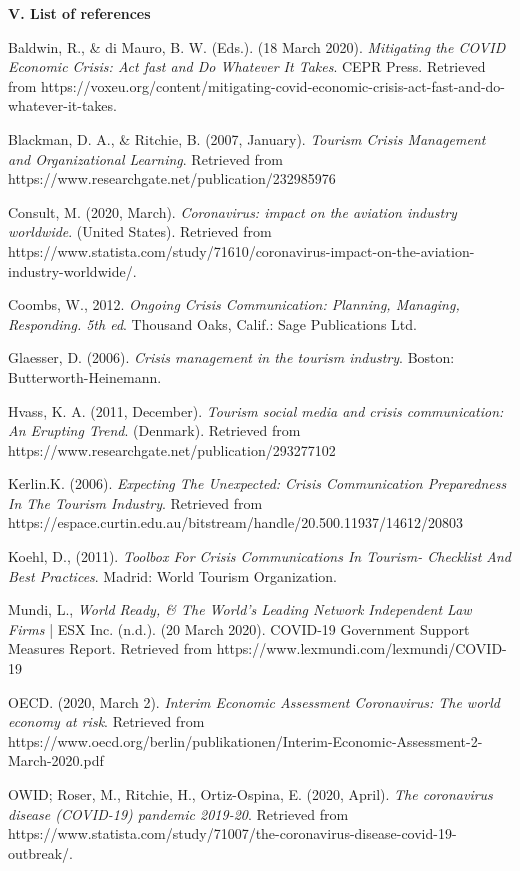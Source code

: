 \thispagestyle{plain}
\textbf{V. List of references}
\begin{flushleft}
		Baldwin, R., \& di Mauro, B. W. (Eds.). (18 March 2020). \textit{Mitigating the COVID Economic Crisis: Act fast and Do Whatever It Takes}. CEPR Press. Retrieved from https://voxeu.org/content/mitigating-covid-economic-crisis-act-fast-and-do-whatever-it-takes.

		Blackman, D. A., \& Ritchie, B. (2007, January). \textit{Tourism Crisis Management and Organizational Learning}. Retrieved from https://www.researchgate.net/publication/232985976

		Consult, M. (2020, March). \textit{Coronavirus: impact on the aviation industry worldwide}. (United States). Retrieved from https://www.statista.com/study/71610/coronavirus-impact-on-the-aviation-industry-worldwide/.

		Coombs, W., 2012. \textit{Ongoing Crisis Communication: Planning, Managing, Responding. 5th ed}. Thousand Oaks, Calif.: Sage Publications Ltd.

		Glaesser, D. (2006). \textit{Crisis management in the tourism industry}. Boston: Butterworth-Heinemann.

		Hvass, K. A. (2011, December). \textit{Tourism social media and crisis communication: An Erupting Trend}. (Denmark). Retrieved from https://www.researchgate.net/publication/293277102

		Kerlin.K. (2006). \textit{Expecting The Unexpected: Crisis Communication Preparedness In The Tourism Industry}. Retrieved from https://espace.curtin.edu.au/bitstream/handle/20.500.11937/14612/20803

		Koehl, D., (2011). \textit{Toolbox For Crisis Communications In Tourism- Checklist And Best Practices}. Madrid: World Tourism Organization.

		Mundi, L., \textit{World Ready, \& The World's Leading Network Independent Law Firms} | ESX Inc. (n.d.). (20 March 2020). COVID-19 Government Support Measures Report. Retrieved from https://www.lexmundi.com/lexmundi/COVID-19

		OECD. (2020, March 2). \textit{Interim Economic Assessment Coronavirus: The world economy at risk}. Retrieved from https://www.oecd.org/berlin/publikationen/Interim-Economic-Assessment-2-March-2020.pdf

		OWID; Roser, M., Ritchie, H., Ortiz-Ospina, E. (2020, April). \textit{The coronavirus disease (COVID-19) pandemic 2019-20}. Retrieved from https://www.statista.com/study/71007/the-coronavirus-disease-covid-19-outbreak/.


\end{flushleft}
